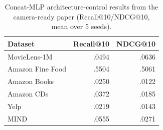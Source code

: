 \begin{table}[t]
  \centering
  \caption{Concat-MLP architecture-control results from the camera-ready paper (Recall@10/NDCG@10, mean over 5 seeds).}
  \label{tab:concat-mlp-5seed}
  \begin{tabular}{lrr}
    \toprule
    \textbf{Dataset} & \textbf{Recall@10} & \textbf{NDCG@10} \\
    \midrule
    MovieLens-1M & .0494 & .0636 \\
    Amazon Fine Food & .5504 & .5061 \\
    Amazon Books & .0250 & .0122 \\
    Amazon CDs & .0372 & .0185 \\
    Yelp & .0219 & .0143 \\
    MIND & .0555 & .0271 \\
    \bottomrule
  \end{tabular}
\end{table}
